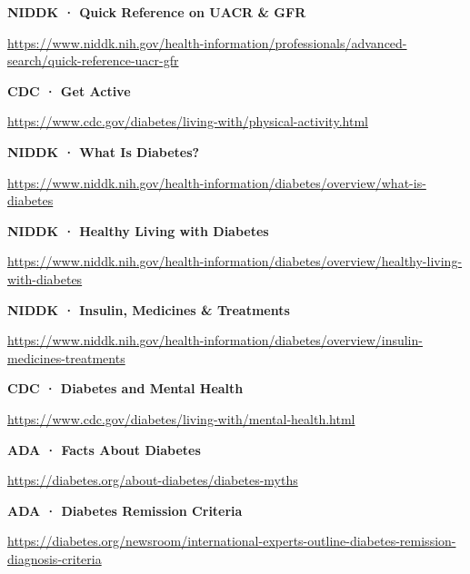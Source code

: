 \noindent\textbf{NIDDK · Quick Reference on UACR \& GFR}\par\noindent\url{https://www.niddk.nih.gov/health-information/professionals/advanced-search/quick-reference-uacr-gfr}\par\medskip

\noindent\textbf{CDC · Get Active}\par\noindent\url{https://www.cdc.gov/diabetes/living-with/physical-activity.html}\par\medskip

\noindent\textbf{NIDDK · What Is Diabetes?}\par\noindent\url{https://www.niddk.nih.gov/health-information/diabetes/overview/what-is-diabetes}\par\medskip

\noindent\textbf{NIDDK · Healthy Living with Diabetes}\par\noindent\url{https://www.niddk.nih.gov/health-information/diabetes/overview/healthy-living-with-diabetes}\par\medskip

\noindent\textbf{NIDDK · Insulin, Medicines \& Treatments}\par\noindent\url{https://www.niddk.nih.gov/health-information/diabetes/overview/insulin-medicines-treatments}\par\medskip

\noindent\textbf{CDC · Diabetes and Mental Health}\par\noindent\url{https://www.cdc.gov/diabetes/living-with/mental-health.html}\par\medskip

\noindent\textbf{ADA · Facts About Diabetes}\par\noindent\url{https://diabetes.org/about-diabetes/diabetes-myths}\par\medskip

\noindent\textbf{ADA · Diabetes Remission Criteria}\par\noindent\url{https://diabetes.org/newsroom/international-experts-outline-diabetes-remission-diagnosis-criteria}\par\medskip